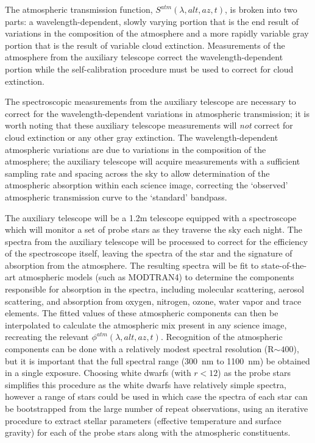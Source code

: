 \documentclass[12pt,preprint]{aastex}
\begin{document}
The atmospheric transmission function, $S^{atm}(\lambda,alt,az,t)$, is
broken into two parts: a wavelength-dependent, slowly varying portion
that is the end result of variations in the composition of the
atmosphere and a more rapidly variable gray portion that is the result
of variable cloud extinction. Measurements of the atmosphere from the
auxiliary telescope correct the wavelength-dependent portion while the
self-calibration procedure must be used to correct for cloud
extinction. 

The spectroscopic measurements from the auxiliary telescope are
necessary to correct for the wavelength-dependent variations in
atmospheric transmission; it is worth noting that these auxiliary
telescope measurements will {\it not} correct for cloud extinction or
any other gray extinction. The wavelength-dependent atmospheric
variations are due to variations in the composition of the atmosphere;
the auxiliary telescope will acquire measurements with a sufficient
sampling rate and spacing across the sky to allow determination of the
atmospheric absorption within each science image, correcting the
`observed' atmospheric transmission curve to the `standard' bandpass.

The auxiliary telescope will be a 1.2m telescope equipped with a
spectroscope which will monitor a set of probe stars as they traverse
the sky each night. The spectra from the auxiliary telescope will be
processed to correct for the efficiency of the spectroscope itself,
leaving the spectra of the star and the signature of absorption from
the atmosphere. The resulting spectra will be fit to state-of-the-art
atmospheric models (such as MODTRAN4) to determine the 
components responsible for absorption in the spectra, including
molecular scattering, aerosol scattering, and absorption from oxygen, nitrogen, ozone,
water vapor and trace elements. The fitted values of these atmospheric components
can then be interpolated to calculate the atmospheric mix present in
any science image, recreating the relevant
$\phi^{atm}(\lambda,alt,az,t)$. Recognition of the atmospheric components
can be done with a relatively modest spectral resolution (R$\sim400$),
but it is important that the full spectral range (300~nm to 1100~nm)
be obtained in a single exposure. Choosing white dwarfs (with $r<12$)
as the probe stars simplifies this procedure as the white dwarfs have
relatively simple spectra, however a range of stars could be used in
which case the spectra of each star can be bootstrapped from the large
number of repeat observations, using an iterative procedure to extract
stellar parameters (effective temperature and surface gravity) for
each of the probe stars along with the atmospheric constituents. 
\end{document}
